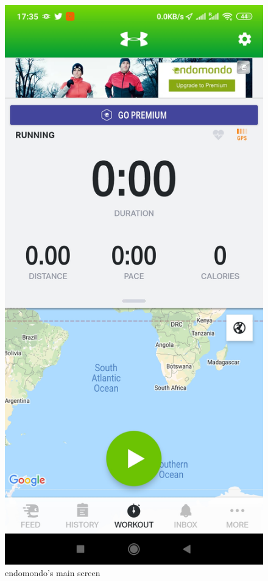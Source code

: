 \begin{figure}[h]
    \includegraphics[width=\textwidth]{Images/endomondo_home.jpg}
    \caption{endomondo's main screen\cite{endomondo-home-img}}
\end{figure}

